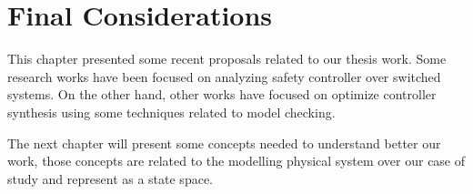 \section{Final Considerations}
This chapter presented some recent proposals related to our thesis work. Some research works have been focused on analyzing safety controller over switched systems. On the other hand, other works have focused on optimize controller synthesis using some techniques related to model checking. 

The next chapter will present some concepts needed to understand better our work, those concepts are related to the modelling physical system over our case of study and represent as a state space.

%
%

%

